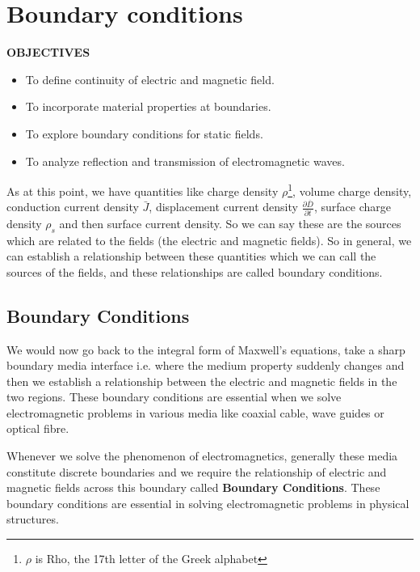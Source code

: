 \chapter{Boundary conditions}\label{lec:lec20}
 \textbf{OBJECTIVES}
 \begin{itemize}
 	\item To define continuity of electric and magnetic field.
 	\item To incorporate material properties at boundaries.
 	\item To explore boundary conditions for static fields.
 	\item To analyze reflection and transmission of electromagnetic waves.
 	
 \end{itemize}

As at this point, we have quantities like charge density $\rho$\footnote[1]{$\rho$ is Rho, the 17th letter of the Greek alphabet}, volume charge density, conduction current density $\bar{J}$, displacement current density $\frac{\partial \bar{D}}{\partial t}$, surface charge density $\rho_s$ and then surface current density. So we can say these are the sources which are related to the fields (the electric and magnetic fields). So in general, we can establish a relationship between these quantities which we can call the sources of the fields, and these relationships are called boundary conditions.

\section{Boundary Conditions}

We would now go back to the integral form of Maxwell's equations, take a sharp boundary media interface i.e. where the medium property suddenly changes and then we establish a relationship between the electric and magnetic fields in the two regions. These boundary conditions are essential when we solve electromagnetic problems in various media like coaxial cable, wave guides or optical fibre.

Whenever we solve the phenomenon of electromagnetics, generally these media constitute discrete boundaries and we require the relationship of electric and magnetic fields across this boundary called \textbf{Boundary Conditions}. These boundary conditions are essential in solving electromagnetic problems in physical structures.

